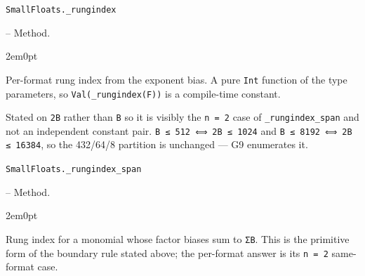 \par\medskip\noindent\begin{minipage}{\linewidth}
\hypertarget{10743025803044024289}{\texttt{SmallFloats.\_\allowbreak{}rungindex}}  -- {Method.}
\nopagebreak
\begin{adjustwidth}{2em}{0pt}

Per-format rung index from the exponent bias. A pure \texttt{Int} function of the type parameters, so \texttt{Val(\_\allowbreak{}rungindex(F))} is a compile-time constant.

Stated on \texttt{2B} rather than \texttt{B} so it is visibly the \texttt{n = 2} case of \texttt{\_\allowbreak{}rungindex\_\allowbreak{}span} and not an independent constant pair. \texttt{B ≤ 512 ⟺ 2B ≤ 1024} and \texttt{B ≤ 8192 ⟺ 2B ≤ 16384}, so the 432/64/8 partition is unchanged — G9 enumerates it.



\end{adjustwidth}
\end{minipage}
\par\medskip

\par\medskip\noindent\begin{minipage}{\linewidth}
\hypertarget{1496290229282609812}{\texttt{SmallFloats.\_\allowbreak{}rungindex\_\allowbreak{}span}}  -- {Method.}
\nopagebreak
\begin{adjustwidth}{2em}{0pt}

Rung index for a monomial whose factor biases sum to \texttt{ΣB}. This is the primitive form of the boundary rule stated above; the per-format answer is its \texttt{n = 2} same-format case.



\end{adjustwidth}
\end{minipage}
\par\medskip

